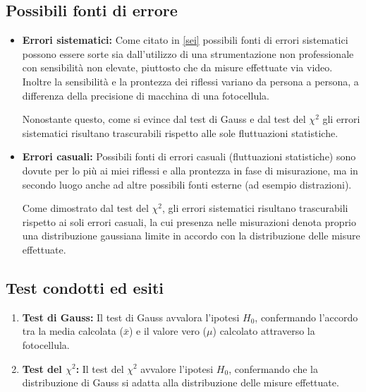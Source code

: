\documentclass{article}
\begin{document}
\subsection{Possibili fonti di errore}
\begin{itemize}
	\item \textbf{Errori sistematici:} Come citato in \ref{sei} possibili fonti di errori sistematici possono essere sorte sia dall'utilizzo di una strumentazione non professionale con sensibilità non elevate, piuttosto che da misure effettuate via video. Inoltre la sensibilità e la prontezza dei riflessi variano da persona a persona, a differenza della precisione di macchina di una fotocellula.
	
	Nonostante questo, come si evince dal test di Gauss e dal test del $\chi^2$ gli errori sistematici risultano trascurabili rispetto alle sole fluttuazioni statistiche.
	
	\item \textbf{Errori casuali:} Possibili fonti di errori casuali (fluttuazioni statistiche) sono dovute per lo più ai miei riflessi e alla prontezza in fase di misurazione, ma in secondo luogo anche ad altre possibili fonti esterne (ad esempio distrazioni).
	
	Come dimostrato dal test del $\chi^2$, gli errori sistematici risultano trascurabili rispetto ai soli errori casuali, la cui presenza nelle misurazioni denota proprio una distribuzione gaussiana limite in accordo con la distribuzione delle misure effettuate.

\end{itemize}

\subsection{Test condotti ed esiti}
\begin{enumerate}
	\item \textbf{Test di Gauss:} Il test di Gauss avvalora l'ipotesi $H_0$, confermando l'accordo tra la media  calcolata ($\bar{x}$) e il valore vero ($\mu$) calcolato attraverso la fotocellula.
	\item \textbf{Test del $\chi^2$:} Il test del $\chi^2$ avvalore l'ipotesi $H_0$, confermando che la distribuzione di Gauss si adatta alla distribuzione delle misure effettuate.
\end{enumerate}
\end{document}

